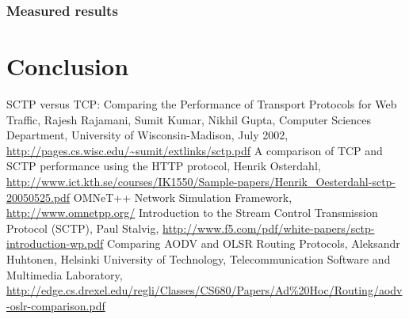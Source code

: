 \documentclass[a4paper]{article}
\begin{document}
\subsubsection{Measured results}

\section{Conclusion}

\begin{thebibliography}{99}
 SCTP versus TCP: Comparing the Performance of Transport Protocols for Web Traffic, Rajesh Rajamani, Sumit Kumar, Nikhil Gupta, Computer Sciences Department, University of Wisconsin-Madison, July 2002, \url{http://pages.cs.wisc.edu/~sumit/extlinks/sctp.pdf}
 A comparison of TCP and SCTP performance using the HTTP protocol, Henrik Osterdahl, \url{http://www.ict.kth.se/courses/IK1550/Sample-papers/Henrik_Oesterdahl-sctp-20050525.pdf}
 OMNeT++ Network Simulation Framework, \url{http://www.omnetpp.org/}
 Introduction to the Stream Control Transmission Protocol (SCTP), Paul Stalvig, \url{http://www.f5.com/pdf/white-papers/sctp-introduction-wp.pdf}
 Comparing AODV and OLSR Routing Protocols, Aleksandr Huhtonen, Helsinki University of Technology, Telecommunication Software and Multimedia Laboratory, \url{http://edge.cs.drexel.edu/regli/Classes/CS680/Papers/Ad%20Hoc/Routing/aodv-oslr-comparison.pdf}
\end{thebibliography}
\end{document}
